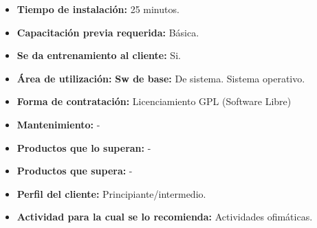 \begin{itemize}
  \item \textbf{Tiempo de instalación:} 25 minutos.
  \item \textbf{Capacitación previa requerida:} Básica.
  \item \textbf{Se da entrenamiento al cliente:} Si.

  \item \textbf{Área de utilización:} \textbf{Sw de base:} De sistema. Sistema operativo.

  \item \textbf{Forma de contratación:} Licenciamiento GPL (Software Libre)
  \item \textbf{Mantenimiento:} -
  \item \textbf{Productos que lo superan:} -
  \item \textbf{Productos que supera:} -
  \item \textbf{Perfil del cliente:} Principiante/intermedio.
  \item \textbf{Actividad para la cual se lo recomienda:} Actividades ofimáticas.
\end{itemize}

